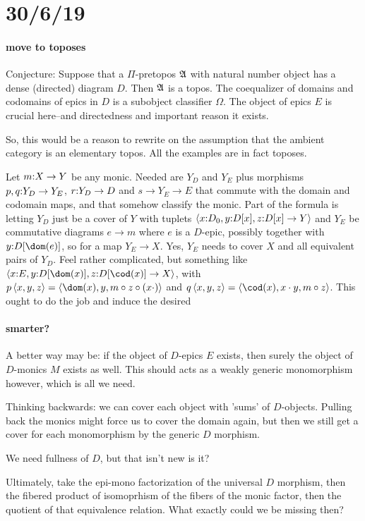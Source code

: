 \documentclass[csh.tex]{subfiles}
\begin{document}
\section{30/6/19}
\paragraph{move to toposes}
Conjecture: 
Suppose that a $\Pi$-pretopos $\mathfrak A$ with natural number object has a dense
(directed) diagram $D$. Then $\mathfrak A$ is a topos. The coequalizer of domains 
and codomains of epics in $D$ is a subobject classifier $\Omega$. The object of
epics $E$ is crucial here--and directedness and important reason it exists.

So, this would be a reason to rewrite on the assumption that the ambient
category is an elementary topos. All the examples are in fact toposes.

Let $m\mathord : X\to Y$ be any monic. Needed are $Y_D$ and $Y_E$ plus morphisms
$p,q\mathord : Y_D\to Y_E$, $r\mathord : Y_D\to D$ and $s\to Y_E \to E$ that commute with
the domain and codomain maps, and that somehow classify the monic.
Part of the formula is letting $Y_D$ just be a cover of $Y$ with tuplets
$\left\langle x\mathord : D_0,y\mathord : D[x],z\mathord : D[x]\to Y \right\rangle$ and $Y_E$ be commutative diagrams
$e\to m$ where $e$ is a $D$-epic, possibly together with $y\of D[\dom(e)]$, so 
for a map $Y_E\to X$. Yes, $Y_E$ needs to cover $X$ and all equivalent pairs of
$Y_D$. Feel rather complicated, but something like 
$\tuplet{x\of E,y\of D[\dom(x)], z\of D[\cod(x)]\to X}$, with 
$p\tuplet{x,y,z} = \tuplet{\dom(x), y, m\circ z\circ (x\cdot)}$ and
$q\tuplet{x,y,z} = \tuplet{\cod(x), x\cdot y, m\circ z}$.
This ought to do the job and induce the desired


\paragraph{smarter?}
A better way may be: if the object of $D$-epics $E$ exists, then surely the 
object of $D$-monics $M$ exists as well. This should acts as a weakly generic 
monomorphism however, which is all we need.

Thinking backwards: we can cover each object with 'sums' of $D$-objects. Pulling
back the monics might force us to cover the domain again, but then we still get
a cover for each monomorphism by the generic $D$ morphism. 

We need fullness of $D$, but that isn't new is it?

Ultimately, take the epi-mono factorization of the universal $D$ morphism, 
then the fibered product of isomoprhism of the fibers of the monic factor, 
then the quotient of that equivalence relation. What exactly could we be missing
then?
\end{document}
